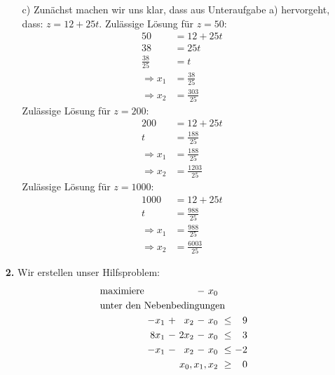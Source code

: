 \documentclass [a4paper,11pt]{article}
\begin{document}
\begin{enumerate}
\begin{enumerate}
            \item[c)]
            Zunächst machen wir uns klar, dass aus Unteraufgabe a) hervorgeht, dass: $z = 12 + 25t$.
            Zulässige Lösung für $z = 50$:
            \begin{align*}
                50 &= 12 + 25t\\
                38 &= 25t\\
                \frac{38}{25} &= t\\
                \Rightarrow
                    x_1 &= \frac{38}{25}\\
                \Rightarrow
                    x_2 &= \frac{303}{25}
            \end{align*}
            Zulässige Lösung für $z = 200$:
            \begin{align*}
                200 &= 12 + 25t\\
                t &= \frac{188}{25}\\
                \Rightarrow x_1 &= \frac{188}{25}\\
                \Rightarrow x_2 &= \frac{1203}{25}
            \end{align*}
            Zulässige Lösung für $z = 1000$:
            \begin{align*}
                1000 &= 12 + 25t\\
                t &= \frac{988}{25}\\
                \Rightarrow x_1 &= \frac{988}{25}\\
                \Rightarrow x_2 &= \frac{6003}{25}
            \end{align*}
        \end{enumerate}
        \item[\textbf{2.}]
        Wir erstellen unser Hilfsproblem:
        \begin{align*}
        \begin{alignedat}{5}
        & \text{maximiere } & & & &\ - &\ x_0 & & \\
        & \rlap{unter den Nebenbedingungen} & & & & & & & \\
        && -x_1 &\ + &\  x_2 &\ - &\ x_0 &\ \leq &\  9 \\
        && 8x_1 &\ - &\ 2x_2 &\ - &\ x_0 &\ \leq &\  3 \\
        && -x_1 &\ - &\  x_2 &\ - &\ x_0 &\ \leq &\ -2 \\
        && & & & & \llap{$x_0, x_1, x_2$} &\ \geq &\ 0 
        \end{alignedat}
        \end{align*}


\end{enumerate}
\end{document}
